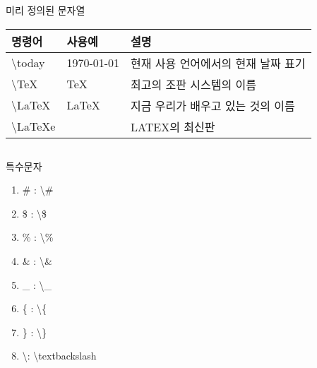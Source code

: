 \documentclass[ aspectratio=149,  14pt,blue,xcolor=pdftex,dvipsnames,table,handout,notes]{beamer}
\begin{document}
		\begin{frame}[t,allowframebreaks]{미리 정의된 문자열}

			\begin{center}
			\begin{table}
			\begin{tabular}{ l l l  }
				명령어	&사용예	&설명\\
				\hline
				\textbackslash today 	&\today 		&현재 사용 언어에서의 현재 날짜 표기\\
				\textbackslash TeX 	&\TeX 		&최고의 조판 시스템의 이름\\
				\textbackslash LaTeX 	&\LaTeX 		&지금 우리가 배우고 있는 것의 이름\\
				\textbackslash LaTeXe 	&\LaTeXe		&LATEX의 최신판\\
			\end{tabular}
			\end{table}
			\end{center}


			\begin{columns}[t]
			\begin{column}{.4\textwidth}
			\begin{block} {특수문자}
			\begin{enumerate}
			\item \# : \textbackslash \# \\
			\item \$ : \textbackslash \$ \\
			\item \% : \textbackslash \% \\
			\item \& : \textbackslash \& \\
			\item \_ : \textbackslash \_ \\
			\item \{ : \textbackslash \{ \\
			\item \} : \textbackslash \} \\
			\item \textbackslash  : \textbackslash textbackslash
			\end{enumerate}
			\end{block}
			\end{column}


\end{columns}
\end{frame}
\end{document}

